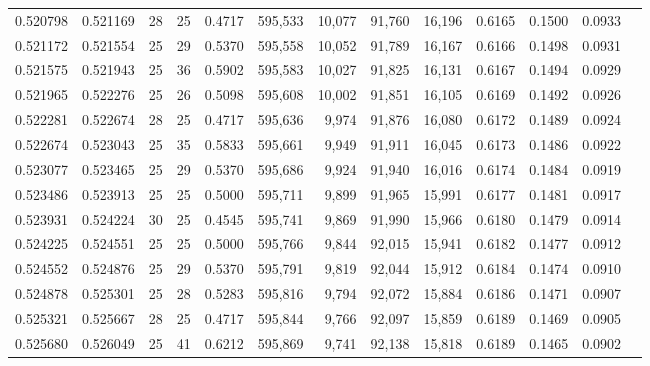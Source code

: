 \begin{tabular}{rrrrrrrrrrrrr}
0.520798 & 0.521169 &    28 &  25 &                                     0.4717 & 595,533 &  10,077 &  91,760 &  16,196 & 0.6165 & 0.1500 & 0.0933 \\
0.521172 & 0.521554 &    25 &  29 &                                     0.5370 & 595,558 &  10,052 &  91,789 &  16,167 & 0.6166 & 0.1498 & 0.0931 \\
0.521575 & 0.521943 &    25 &  36 &                                     0.5902 & 595,583 &  10,027 &  91,825 &  16,131 & 0.6167 & 0.1494 & 0.0929 \\
0.521965 & 0.522276 &    25 &  26 &                                     0.5098 & 595,608 &  10,002 &  91,851 &  16,105 & 0.6169 & 0.1492 & 0.0926 \\
0.522281 & 0.522674 &    28 &  25 &                                     0.4717 & 595,636 &   9,974 &  91,876 &  16,080 & 0.6172 & 0.1489 & 0.0924 \\
0.522674 & 0.523043 &    25 &  35 &                                     0.5833 & 595,661 &   9,949 &  91,911 &  16,045 & 0.6173 & 0.1486 & 0.0922 \\
0.523077 & 0.523465 &    25 &  29 &                                     0.5370 & 595,686 &   9,924 &  91,940 &  16,016 & 0.6174 & 0.1484 & 0.0919 \\
0.523486 & 0.523913 &    25 &  25 &                                     0.5000 & 595,711 &   9,899 &  91,965 &  15,991 & 0.6177 & 0.1481 & 0.0917 \\
0.523931 & 0.524224 &    30 &  25 &                                     0.4545 & 595,741 &   9,869 &  91,990 &  15,966 & 0.6180 & 0.1479 & 0.0914 \\
0.524225 & 0.524551 &    25 &  25 &                                     0.5000 & 595,766 &   9,844 &  92,015 &  15,941 & 0.6182 & 0.1477 & 0.0912 \\
0.524552 & 0.524876 &    25 &  29 &                                     0.5370 & 595,791 &   9,819 &  92,044 &  15,912 & 0.6184 & 0.1474 & 0.0910 \\
0.524878 & 0.525301 &    25 &  28 &                                     0.5283 & 595,816 &   9,794 &  92,072 &  15,884 & 0.6186 & 0.1471 & 0.0907 \\
0.525321 & 0.525667 &    28 &  25 &                                     0.4717 & 595,844 &   9,766 &  92,097 &  15,859 & 0.6189 & 0.1469 & 0.0905 \\
0.525680 & 0.526049 &    25 &  41 &                                     0.6212 & 595,869 &   9,741 &  92,138 &  15,818 & 0.6189 & 0.1465 & 0.0902 \\

\end{tabular}

